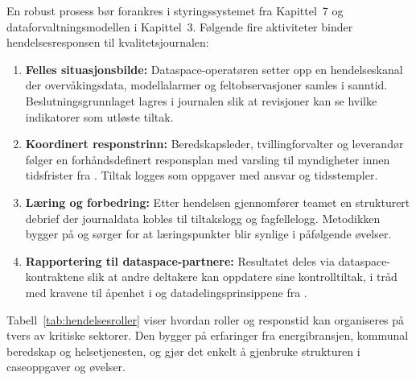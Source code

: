 En robust prosess bør forankres i styringssystemet fra Kapittel~7 og dataforvaltningsmodellen i Kapittel~3. Følgende fire aktiviteter binder hendelsesresponsen til kvalitetsjournalen:
\begin{enumerate}
    \item \textbf{Felles situasjonsbilde:} Dataspace-operatøren setter opp en hendelseskanal der overvåkingsdata, modellalarmer og feltobservasjoner samles i sanntid. Beslutningsgrunnlaget lagres i journalen slik at revisjoner kan se hvilke indikatorer som utløste tiltak.
    \item \textbf{Koordinert responstrinn:} Beredskapsleder, tvillingforvalter og leverandør følger en forhåndsdefinert responsplan med varsling til myndigheter innen tidsfrister fra \citet{eu2022nis2}. Tiltak logges som oppgaver med ansvar og tidsstempler.
    \item \textbf{Læring og forbedring:} Etter hendelsen gjennomfører teamet en strukturert debrief der journaldata kobles til tiltakslogg og fagfellelogg. Metodikken bygger på \citet{dsb2023ovelser} og sørger for at læringspunkter blir synlige i påfølgende øvelser.
    \item \textbf{Rapportering til dataspace-partnere:} Resultatet deles via dataspace-kontraktene slik at andre deltakere kan oppdatere sine kontrolltiltak, i tråd med kravene til åpenhet i \citet{nho2023datadeling} og datadelingsprinsippene fra \citet{dssc2023skills}.
\end{enumerate}

Tabell~\ref{tab:hendelsesroller} viser hvordan roller og responstid kan organiseres på tvers av kritiske sektorer. Den bygger på erfaringer fra energibransjen, kommunal beredskap og helsetjenesten, og gjør det enkelt å gjenbruke strukturen i caseoppgaver og øvelser.

